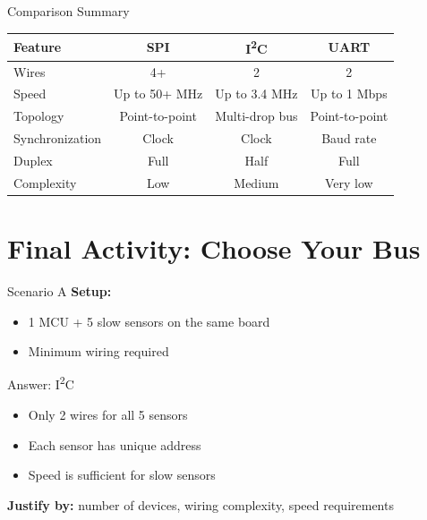 \documentclass[aspectratio=169,11pt]{beamer}
\begin{document}
\begin{frame}{Comparison Summary}
    \begin{table}
        \centering
        \begin{tabular}{lccc}
            \toprule
            \textbf{Feature} & \textbf{SPI} & \textbf{I\textsuperscript{2}C} & \textbf{UART} \\
            \midrule
            Wires & 4+ & 2 & 2 \\
            Speed & Up to 50+ MHz & Up to 3.4 MHz & Up to 1 Mbps \\
            Topology & Point-to-point & Multi-drop bus & Point-to-point \\
            Synchronization & Clock & Clock & Baud rate \\
            Duplex & Full & Half & Full \\
            Complexity & Low & Medium & Very low \\
            \bottomrule
        \end{tabular}
    \end{table}
    
    \vspace{0.3cm}
    \footnotesize
    \cite{wolf2012computers}
\end{frame}

\section{Final Activity: Choose Your Bus}

\begin{frame}{Scenario A}
    \textbf{Setup:}
    \begin{itemize}
        \item 1 MCU + 5 slow sensors on the same board
        \item Minimum wiring required
    \end{itemize}
    
    \vspace{0.5cm}
    \pause
    \begin{block}{Answer: I\textsuperscript{2}C}
        \begin{itemize}
            \item Only 2 wires for all 5 sensors
            \item Each sensor has unique address
            \item Speed is sufficient for slow sensors
        \end{itemize}
    \end{block}
    
    \vspace{0.3cm}
    \textbf{Justify by:} number of devices, wiring complexity, speed requirements
\end{frame}
\end{document}
